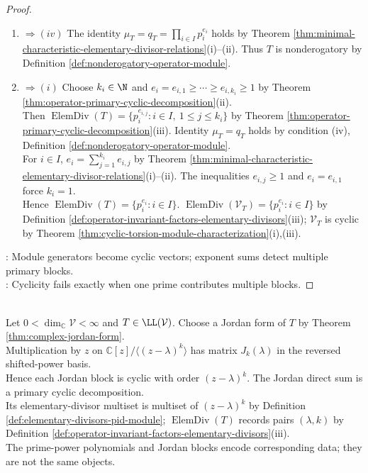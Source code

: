 \begin{theorem}
\begin{proof}
\begin{enumerate}[label=(\roman*)]
\item[$(iii)$]$\Rightarrow (iv)$ The identity $\mu_T=q_T=\prod\limits_{i\in I}p_i^{e_i}$ holds by Theorem \ref{thm:minimal-characteristic-elementary-divisor-relations}(i)--(ii). Thus $T$ is nonderogatory by Definition \ref{def:nonderogatory-operator-module}.
\item[$(iv)$]$\Rightarrow (i)$ Choose $k_i\in\N$ and $e_i=e_{i,1}\geq\cdots\geq e_{i,k_i}\geq1$ by Theorem \ref{thm:operator-primary-cyclic-decomposition}(ii).\\
Then $\operatorname{ElemDiv}(T)=\{p_i^{e_{i,j}}:i\in I,\ 1\leq j\leq k_i\}$ by Theorem \ref{thm:operator-primary-cyclic-decomposition}(iii). Identity $\mu_T=q_T$ holds by condition (iv), Definition \ref{def:nonderogatory-operator-module}.\\
For $i\in I$, $e_i=\sum\limits_{j=1}^{k_i}e_{i,j}$ by Theorem \ref{thm:minimal-characteristic-elementary-divisor-relations}(i)--(ii). The inequalities $e_{i,j}\geq1$ and $e_i=e_{i,1}$ force $k_i=1$.\\
Hence $\operatorname{ElemDiv}(T)=\{p_i^{e_i}:i\in I\}$. $\operatorname{ElemDiv}(\mathcal{V}_T)=\{p_i^{e_i}:i\in I\}$ by Definition \ref{def:operator-invariant-factors-elementary-divisors}(iii); $\mathcal{V}_T$ is cyclic by Theorem \ref{thm:cyclic-torsion-module-characterization}(i),(iii).
\end{enumerate}
: Module generators become cyclic vectors; exponent sums detect multiple primary blocks.\\
: Cyclicity fails exactly when one prime contributes multiple blocks.
\end{proof}
\end{theorem}

\begin{perspective} \label{per:elementary-divisors-and-jordan-blocks} \\
Let $0<\dim_{\mathbb{C}}\mathcal{V}<\infty$ and $T\in\LL(\mathcal{V})$. Choose a Jordan form of $T$ by Theorem \ref{thm:complex-jordan-form}.\\
Multiplication by $z$ on $\mathbb{C}[z]/\langle(z-\lambda)^k\rangle$ has matrix $J_k(\lambda)$ in the reversed shifted-power basis.\\
Hence each Jordan block is cyclic with order $(z-\lambda)^k$. The Jordan direct sum is a primary cyclic decomposition.\\
Its elementary-divisor multiset is multiset of $(z-\lambda)^k$ by Definition \ref{def:elementary-divisors-pid-module}; $\operatorname{ElemDiv}(T)$ records pairs $(\lambda,k)$ by Definition \ref{def:operator-invariant-factors-elementary-divisors}(iii).\\
The prime-power polynomials and Jordan blocks encode corresponding data; they are not the same objects.
\end{perspective}
